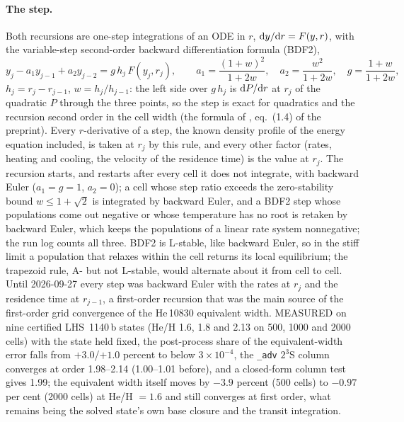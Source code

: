 \paragraph{The step.} Both recursions are one-step integrations of an ODE in
$r$, ${\rm d}y/{\rm d}r = F(y, r)$, with the variable-step second-order
backward differentiation formula (BDF2),
%
\begin{equation}
  y_j - a_1 y_{j-1} + a_2 y_{j-2} = g\,h_j\,F(y_j, r_j),\qquad
  a_1 = \frac{(1+w)^2}{1+2w},\quad a_2 = \frac{w^2}{1+2w},\quad
  g = \frac{1+w}{1+2w},
  \label{eq:pp:bdf2}
\end{equation}
%
$h_j = r_j - r_{j-1}$, $w = h_j/h_{j-1}$: the left side over $g\,h_j$ is
${\rm d}P/{\rm d}r$ at $r_j$ of the quadratic $P$ through the three points,
so the step is exact for quadratics and the recursion second order in the
cell width (the formula of \citealt{LiLiao2022}, eq.~(1.4) of the preprint).
Every $r$-derivative of a step, the known density profile of the energy
equation included, is taken at $r_j$ by this rule, and every other factor
(rates, heating and cooling, the velocity of the residence time) is the value
at $r_j$.  The recursion starts, and restarts after every cell it does not
integrate, with backward Euler ($a_1 = g = 1$, $a_2 = 0$); a cell whose step
ratio exceeds the zero-stability bound $w \le 1 + \sqrt2$ is integrated by
backward Euler, and a BDF2 step whose populations come out negative or whose
temperature has no root is retaken by backward Euler, which keeps the
populations of a linear rate system nonnegative; the run log counts all
three.  BDF2 is L-stable, like backward Euler, so in the stiff limit a
population that relaxes within the cell returns its local equilibrium; the
trapezoid rule, A- but not L-stable, would alternate about it from cell to
cell.  Until 2026-09-27 every step was backward Euler with the rates at $r_j$
and the residence time at $r_{j-1}$, a first-order recursion that was the
main source of the first-order grid convergence of the He\,10830 equivalent
width.  MEASURED on nine certified LHS~1140\,b states (He/H 1.6, 1.8 and 2.13
on 500, 1000 and 2000 cells) with the state held fixed, the post-process
share of the equivalent-width error falls from $+3.0$/$+1.0$ percent to
below $3\times10^{-4}$, the \texttt{\_adv} $2^3$S column converges at order
1.98--2.14 (1.00--1.01 before), and a closed-form column test gives 1.99; the
equivalent width itself moves by $-3.9$ percent (500 cells) to $-0.97$ per
cent (2000 cells) at He/H $=1.6$ and still converges at first order, what
remains being the solved state's own base closure and the transit
integration.

